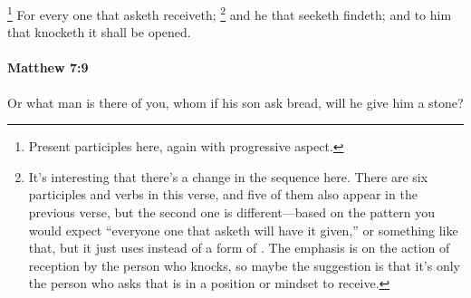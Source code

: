 				\footnote{%
					Present participles here, again with progressive aspect.
					}%
			For every one that asketh receiveth;%
				\footnote{%
					It's interesting that there's a change in the sequence here. There are six participles and verbs in this verse, and five of them also appear in the previous verse, but the second one is different---based on the pattern you would expect ``everyone one that asketh will have it given,'' or something like that, but it just uses  instead of a form of . The emphasis is on the action of reception by the person who knocks, so maybe the suggestion is that it's only the person who asks that is in a position or mindset to receive.
					}
			and he that seeketh findeth; and to him that knocketh it shall be opened.

			\begin{framed}
			\scriptsize
				\begin{compactdesc}
					\item[SBLG] 
				\end{compactdesc}
			\end{framed}

		\paragraph{Matthew 7:9} %
			\label{MATTHEW-7-9}

			Or what man is there of you, whom if his son ask bread, will he give him a stone?

